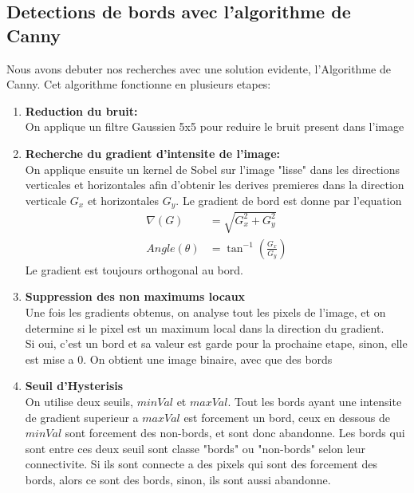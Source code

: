 \documentclass[a4paper, 12pt, titlepage, oneside]{article}
\begin{document}
	\subsection{Detections de bords avec l'algorithme de Canny}
	Nous avons debuter nos recherches avec une solution evidente, l'Algorithme de Canny. Cet algorithme fonctionne en plusieurs etapes:
	\begin{enumerate}
		\item \textbf{Reduction du bruit:}\\
			\indent On applique un filtre Gaussien 5x5 pour reduire le bruit present dans l'image
		\item \textbf{Recherche du gradient d'intensite de l'image:}\\  
		 	\indent On applique ensuite un kernel de Sobel sur l'image "lisse" dans les directions verticales et horizontales afin d'obtenir les derives premieres dans
		la direction verticale $G_x$ et horizontales $G_y$. Le gradient de bord est donne par l'equation
			\begin{align}
				\nabla (G) & = \sqrt{G_x^2 + G_y^2}\\
				Angle (\theta) & = \tan^{-1}(\frac{G_x}{G_y})
			\end{align}
		Le gradient est toujours orthogonal au bord.

		\item \textbf{Suppression des non maximums locaux}\\
			\indent Une fois les gradients obtenus, on analyse tout les pixels de l'image, et on determine si le pixel est un maximum local dans la
			direction du gradient. \\
			Si oui, c'est un bord et sa valeur est garde pour la prochaine etape, sinon, elle est mise a 0. On obtient une image binaire, avec que des bords

		\item \textbf{Seuil d'Hysterisis} \\
			\indent On utilise deux seuils, $minVal$ et $maxVal$. Tout les bords ayant une intensite de gradient superieur a $maxVal$ est forcement un
			bord, ceux en dessous de $minVal$ sont forcement des non-bords, et sont donc abandonne. Les bords qui sont entre ces deux seuil sont classe
			"bords" ou "non-bords" selon leur connectivite. Si ils sont connecte a des pixels qui sont des forcement des bords, alors ce sont des bords,
			sinon, ils sont aussi abandonne.\\
		
	\end{enumerate}
\end{document}

